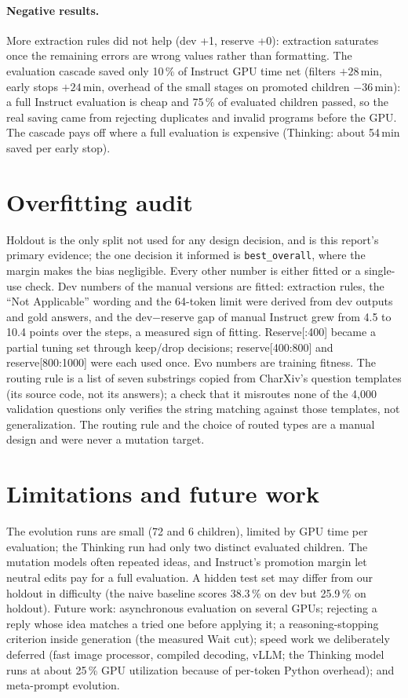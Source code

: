 \documentclass{article}
\begin{document}
\paragraph{Negative results.} More extraction rules did not help (dev +1, reserve +0): extraction saturates once the
remaining errors are wrong values rather than formatting. The evaluation cascade saved only 10\,\% of Instruct GPU
time net (filters $+28$\,min, early stops $+24$\,min, overhead of the small stages on promoted children $-36$\,min):
a full Instruct evaluation is cheap and 75\,\% of evaluated children passed, so the real saving came from rejecting
duplicates and invalid programs before the GPU. The cascade pays off where a full evaluation is expensive (Thinking:
about 54\,min saved per early stop).

\section{Overfitting audit}
\label{sec:audit}

Holdout is the only split not used for any design decision, and is this report's primary evidence; the one decision
it informed is \texttt{best\_overall}, where the margin makes the bias negligible. Every other number is either fitted
or a single-use check. Dev numbers of the manual versions are fitted: extraction rules, the ``Not Applicable'' wording
and the 64-token limit were derived from dev outputs and gold answers, and the dev$-$reserve gap of manual Instruct grew
from 4.5 to 10.4 points over the steps, a measured sign of fitting. Reserve[:400] became a partial tuning set through
keep/drop decisions; reserve[400:800] and reserve[800:1000] were each used once. Evo numbers are training fitness.
The routing rule is a list of seven substrings copied from CharXiv's question templates (its source code, not its
answers); a check that it misroutes none of the 4{,}000 validation questions only verifies the string matching
against those templates, not generalization. The routing rule and the choice of routed types are a manual design and
were never a mutation target.

\section{Limitations and future work}

The evolution runs are small (72 and 6 children), limited by GPU time per evaluation; the Thinking run had only two
distinct evaluated children. The mutation models often repeated ideas, and Instruct's promotion margin let neutral
edits pay for a full evaluation. A hidden test set may differ from our holdout in difficulty (the naive baseline scores
38.3\,\% on dev but 25.9\,\% on holdout). Future work: asynchronous evaluation on several GPUs; rejecting a reply whose
idea matches a tried one before applying it; a reasoning-stopping criterion inside generation (the measured Wait
cut); speed work we deliberately deferred (fast image processor, compiled decoding, vLLM; the Thinking model runs at
about 25\,\% GPU utilization because of per-token Python overhead); and meta-prompt evolution.
\end{document}
